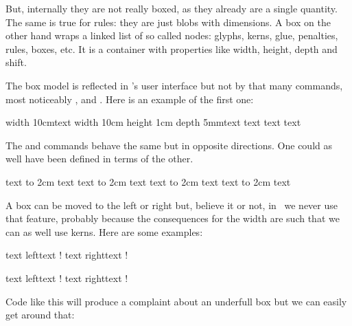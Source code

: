 But, internally they are not really boxed, as they already are a single quantity.
The same is true for rules: they are just blobs with dimensions. A box on the
other hand wraps a linked list of so called nodes: glyphs, kerns, glue,
penalties, rules, boxes, etc. It is a container with properties like width,
height, depth and shift.

\stopsubsection

\stopsection

\startsection[title={\TEX\ primitives}]

The box model is reflected in \TEX's user interface but not by that many
commands, most noticeably \type {\hbox}, \type {\vbox} and \type {\vtop}. Here is
an example of the first one:

\starttyping[option=TEX]
\hbox width 10cm{text}
\hbox width 10cm height 1cm depth 5mm{text}
text \hbox{text} text
\stoptyping

The \type {\raise} and \type {\lower} commands behave the same but in opposite
directions. One could as well have been defined in terms of the other.

\startbuffer
text \raise  5mm \hbox to 2cm {text}
text \lower -5mm \hbox to 2cm {text}
text \raise -5mm \hbox to 2cm {text}
text \lower  5mm \hbox to 2cm {text}
\stopbuffer

\typebuffer[option=TEX]

\startlinecorrection
{\dontcomplain\showboxes\getbuffer}
\stoplinecorrection

A box can be moved to the left or right but, believe it or not, in \CONTEXT\ we
never use that feature, probably because the consequences for the width are such
that we can as well use kerns. Here are some examples:

\startbuffer
text \vbox{\moveleft  5mm \hbox {left}}text !
text \vbox{\moveright 5mm \hbox{right}}text !
\stopbuffer

\typebuffer[option=TEX]

\startlinecorrection
{\dontcomplain\getbuffer}
\stoplinecorrection

\startbuffer
text \vbox{\moveleft  25mm \hbox {left}}text !
text \vbox{\moveright 25mm \hbox{right}}text !
\stopbuffer

\typebuffer[option=TEX]

\startlinecorrection
{\dontcomplain\getbuffer}
\stoplinecorrection

Code like this will produce a complaint about an underfull box but we can easily
get around that:

